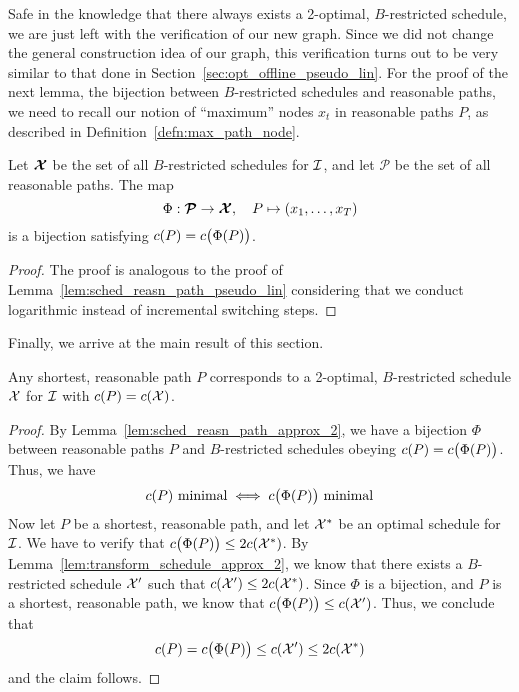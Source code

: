 Safe in the knowledge that there always exists a 2-optimal, $B$-restricted schedule, we are just left with the verification of our new graph. Since we did not change the general construction idea of our graph, this verification turns out to be very similar to that done in Section~\ref{sec:opt_offline_pseudo_lin}. For the proof of the next lemma, the bijection between $B$-restricted schedules and reasonable paths, we need to recall our notion of ``maximum'' nodes $x_t$ in reasonable paths $P$, as described in Definition~\ref{defn:max_path_node}.
\begin{lem}\label{lem:sched_reasn_path_approx_2}
Let $\bm{\mathcal{X}}$ be the set of all $B$-restricted schedules for $\mathcal{I}$, and let $\bm{\mathcal{P}}$ be the set of all reasonable paths. The map
\begin{equation*}
	\Phi:\bm{\mathcal{P}}\rightarrow\bm{\mathcal{X}},\quad P\mapsto (x_1,\dotsc,x_T)
\end{equation*}
is a bijection satisfying $c(P)=c\bigl(\Phi(P)\bigr)$.
\end{lem}
\begin{proof}
The proof is analogous to the proof of Lemma~\ref{lem:sched_reasn_path_pseudo_lin} considering that we conduct logarithmic instead of incremental switching steps.
\end{proof}
Finally, we arrive at the main result of this section.
\begin{thm}\label{thm:approx_2}
Any shortest, reasonable path $P$ corresponds to a 2-optimal, $B$-restricted schedule $\mathcal{X}$ for $\mathcal{I}$ with $c(P)=c(\mathcal{X})$.
\end{thm} 
\begin{proof}
By Lemma~\ref{lem:sched_reasn_path_approx_2}, we have a bijection $\Phi$ between reasonable paths $P$ and $B$-restricted schedules obeying $c(P)=c\bigl(\Phi(P)\bigr)$. Thus, we have 
\begin{equation*}
	c(P)\text{ minimal}\iff c\bigl(\Phi(P)\big)\text{ minimal}
\end{equation*}
Now let $P$ be a shortest, reasonable path, and let $\mathcal{X}^*$ be an optimal schedule for $\mathcal{I}$. We have to verify that $c\bigl(\Phi(P)\bigr)\le 2c(\mathcal{X}^*)$. By Lemma~\ref{lem:transform_schedule_approx_2}, we know that there exists a $B$-restricted schedule $\mathcal{X}'$ such that $c(\mathcal{X}')\le 2c(\mathcal{X}^*)$. Since $\Phi$ is a bijection, and $P$ is a shortest, reasonable path, we know that $c\bigl(\Phi(P)\bigr)\le c(\mathcal{X}')$. Thus, we conclude that 
\begin{equation*}
	c(P)=c\bigl(\Phi(P)\bigr)\le c(\mathcal{X}')\le 2c(\mathcal{X}^*)
\end{equation*}
and the claim follows.
\end{proof}
